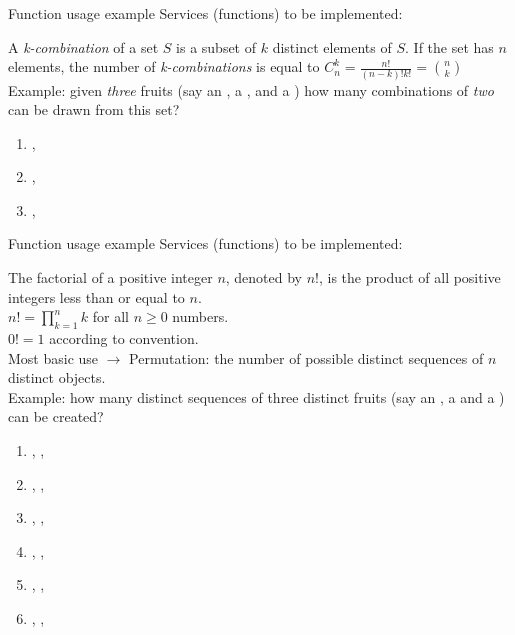 \documentclass[usenames,dvipsnames,aspectratio=169]{beamer}
\begin{document}
\begin{frame}{Function usage example}
  Services (functions) to be implemented:
  \vfill
  \begin{description}[mm]
    \item[Combination] A \emph{k-combination} of a set $S$ is a subset of $k$ distinct elements of $S$. If the set has $n$ elements, the number of \emph{k-combinations} is equal to
    \vfill
    $C_n^k = \frac{n!}{(n-k)!k!} = {n \choose k}$\\
    \vfill
    Example: given \emph{three} fruits (say an , a , and a ) how many combinations of \emph{two} can be drawn from this set?
    \begin{enumerate}
      \item {}, 
      \item {}, 
      \item {}, 
    \end{enumerate}
  \end{description}
\end{frame}

\begin{frame}{Function usage example}
  Services (functions) to be implemented:
  \begin{description}[mm]
    \item[Factorial] The factorial of a positive integer $n$, denoted by $n!$, is the product of all positive integers less than or equal to $n$.\\
    $n! = \prod_{k=1}^{n}k$ for all $n \geq 0$ numbers.\\
    $0! = 1$ according to convention.\\
    Most basic use $\to$ Permutation: the number of possible distinct sequences of $n$ distinct objects.\\
    Example: how many distinct sequences of three distinct fruits (say an , a  and a ) can be created?
    \begin{enumerate}
      \item {}, , 
      \item {}, , 
      \item {}, , 
      \item {}, , 
      \item {}, , 
      \item {}, , 
    \end{enumerate}
  \end{description}
\end{frame}
\end{document}
